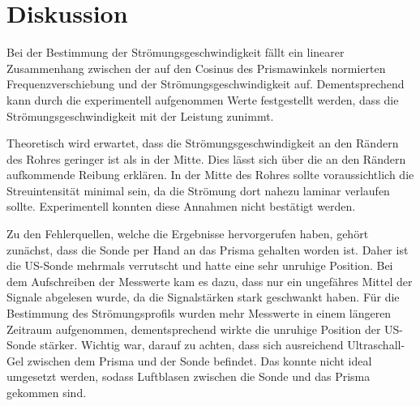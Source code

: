 \section{Diskussion}
\label{sec:diskussion}

Bei der Bestimmung der Strömungsgeschwindigkeit fällt ein linearer Zusammenhang zwischen
der auf den Cosinus des Prismawinkels normierten Frequenzverschiebung und der Strömungsgeschwindigkeit auf. Dementsprechend kann durch die experimentell 
aufgenommen Werte festgestellt werden, dass die Strömungsgeschwindigkeit mit der Leistung zunimmt.

Theoretisch wird erwartet, dass die Strömungsgeschwindigkeit an den Rändern des Rohres geringer ist als in der Mitte.
Dies lässt sich über die an den Rändern aufkommende Reibung erklären. In der Mitte des Rohres sollte voraussichtlich
die Streuintensität minimal sein, da die Strömung dort nahezu laminar verlaufen sollte.
Experimentell konnten diese Annahmen nicht bestätigt werden.

Zu den Fehlerquellen, welche die Ergebnisse hervorgerufen haben, gehört zunächst, dass die Sonde per Hand an das Prisma gehalten
worden ist. Daher ist die US-Sonde mehrmals verrutscht und hatte eine sehr unruhige Position.
Bei dem Aufschreiben der Messwerte kam es dazu, dass nur ein ungefähres Mittel der Signale abgelesen wurde, da die 
Signalstärken stark geschwankt haben. Für die Bestimmung des Strömungsprofils wurden mehr Messwerte in einem längeren Zeitraum 
aufgenommen, dementsprechend wirkte die unruhige Position der US-Sonde stärker. Wichtig war, darauf zu achten, dass sich ausreichend
Ultraschall-Gel zwischen dem Prisma und der Sonde befindet. Das konnte nicht ideal umgesetzt werden, sodass Luftblasen zwischen die Sonde
und das Prisma gekommen sind.
